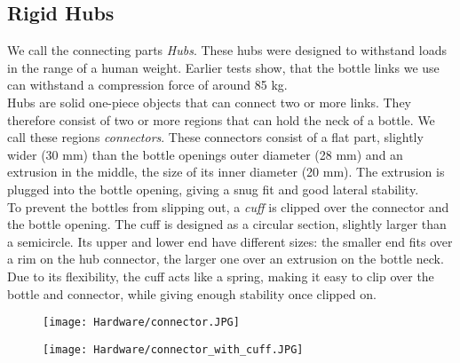 \subsection{Rigid Hubs}
We call the connecting parts \textit{Hubs}. These hubs were designed to withstand loads in the range of a human weight. Earlier tests show, that the bottle links we use can withstand a compression force of around 85 kg.\\
Hubs are solid one-piece objects that can connect two or more links. They therefore consist of two or more regions that can hold the neck of a bottle. We call these regions \textit{connectors}. These connectors consist of a flat part, slightly wider (30 mm) than the bottle openings outer diameter (28 mm) and an extrusion in the middle, the size of its inner diameter (20 mm). The extrusion is plugged into the bottle opening, giving a snug fit and good lateral stability.\\
To prevent the bottles from slipping out, a \textit{cuff} is clipped over the connector and the bottle opening. The cuff is designed as a circular section, slightly larger than a semicircle. Its upper and lower end have different sizes: the smaller end fits over a rim on the hub connector, the larger one over an extrusion on the bottle neck. Due to its flexibility, the cuff acts like a spring, making it easy to clip over the bottle and connector, while giving enough stability once clipped on.
\begin{figure}
  \centering
  \begin{minipage}{.5\textwidth}
    \centering
    \texttt{[image: Hardware/connector.JPG]}
    \label{fig:connector}
  \end{minipage}%
  \begin{minipage}{.5\textwidth}
    \centering
    \texttt{[image: Hardware/connector\_with\_cuff.JPG]}
    \label{fig:connector_with_cuff}
  \end{minipage}
\end{figure}

